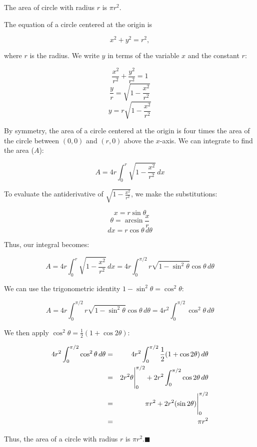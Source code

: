 \begin{prf}
The area of circle with radius $r$ is $\pi r^2$.
\end{prf}

 The equation of a circle centered at the
origin is

$$
x^2 + y^2 = r^2,
$$

\noindent where $r$ is the radius.  We  write $y$ in terms of the
variable $x$ and the constant $r$:

$$
\frac{x^2}{r^2} + \frac{y^2}{r^2} = 1
$$
$$
\frac{y}{r} = \sqrt{1-\frac{x^2}{r^2}}
$$
$$
y= r\sqrt {1-\frac{x^2}{r^2}}
$$

By symmetry, the area of a circle centered at the origin is four
times the area of the circle between $(0,0)$ and $(r, 0)$ above the
$x$-axis.  We can integrate to find the area ($A$):

$$
A = 4r\int_0^r \sqrt {1-\frac{x^2}{r^2}}\, dx
$$

To evaluate the antiderivative of $\displaystyle\sqrt
{1-\frac{x^2}{r^2}}$, we make the substitutions:

$$
x = r \sin \theta
$$
$$
\theta = \arcsin \frac{x}{r}
$$
$$
dx = r\cos \theta\, d\theta
$$

Thus, our integral becomes:

$$
A=4r\int_0^r \sqrt {1-\frac{x^2}{r^2}}\, dx = 4r\int_0^{\pi/2}
r\sqrt{1-\sin^2 \theta} \cos \theta\, d\theta
$$

 We can use the trigonometric identity $1 - \sin^2 \theta = \cos^2 \theta$:

$$
A=4r\int_0^{\pi/2} r\sqrt{1-\sin^2 \theta} \cos \theta\, d\theta=
4r^2\int_0^{\pi/2} \cos^2 \theta\, d\theta
$$

We then apply $\cos^2 \theta = \frac{1}{2}(1 + \cos 2\theta)$:

\begin{eqnarray*}
4r^2\int_0^{\pi/2} \cos^2 \theta\, d\theta &=& 4r^2\int_0^{\pi/2}  \frac{1}{2}(1 + \cos 2\theta) \,d\theta\\
& = & {2r^2\theta}\Bigg{|}_0^{\pi/2} + 2r^2\int_0^{\pi/2} \cos 2\theta \,d\theta\\
                                  & = & \pi r^2 + 2r^2(\sin2\theta)\Bigg{|}_0^{\pi/2}\\
                                  & = & \pi r^2
\end{eqnarray*}

Thus, the area of a circle with radius $r$ is $\pi
r^2$.\hfill$\blacksquare$
